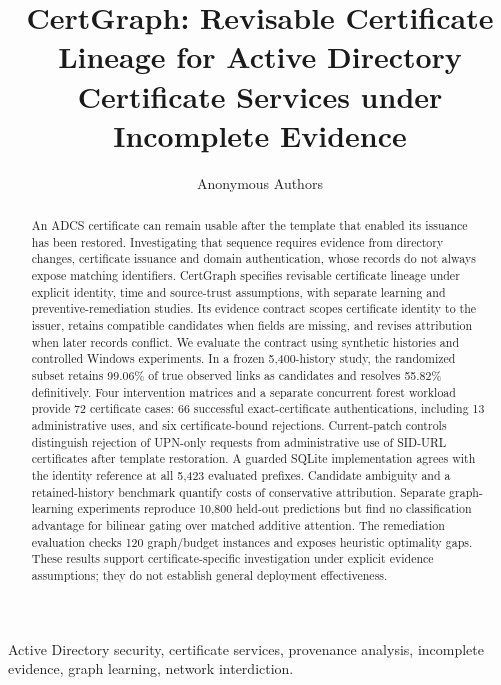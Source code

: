 \documentclass[journal]{IEEEtran}
\title{CertGraph: Revisable Certificate Lineage for Active Directory Certificate Services under Incomplete Evidence}
\author{Anonymous Authors}
\begin{document}
\maketitle

\begin{abstract}
An ADCS certificate can remain usable after the template that enabled its issuance has been restored. Investigating that sequence requires evidence from directory changes, certificate issuance and domain authentication, whose records do not always expose matching identifiers. CertGraph specifies revisable certificate lineage under explicit identity, time and source-trust assumptions, with separate learning and preventive-remediation studies. Its evidence contract scopes certificate identity to the issuer, retains compatible candidates when fields are missing, and revises attribution when later records conflict. We evaluate the contract using synthetic histories and controlled Windows experiments. In a frozen 5,400-history study, the randomized subset retains 99.06\% of true observed links as candidates and resolves 55.82\% definitively. Four intervention matrices and a separate concurrent forest workload provide 72 certificate cases: 66 successful exact-certificate authentications, including 13 administrative uses, and six certificate-bound rejections. Current-patch controls distinguish rejection of UPN-only requests from administrative use of SID-URL certificates after template restoration. A guarded SQLite implementation agrees with the identity reference at all 5,423 evaluated prefixes. Candidate ambiguity and a retained-history benchmark quantify costs of conservative attribution. Separate graph-learning experiments reproduce 10,800 held-out predictions but find no classification advantage for bilinear gating over matched additive attention. The remediation evaluation checks 120 graph/budget instances and exposes heuristic optimality gaps. These results support certificate-specific investigation under explicit evidence assumptions; they do not establish general deployment effectiveness.
\end{abstract}

\begin{IEEEkeywords}
Active Directory security, certificate services, provenance analysis, incomplete evidence, graph learning, network interdiction.
\end{IEEEkeywords}







\appendices





\end{document}
